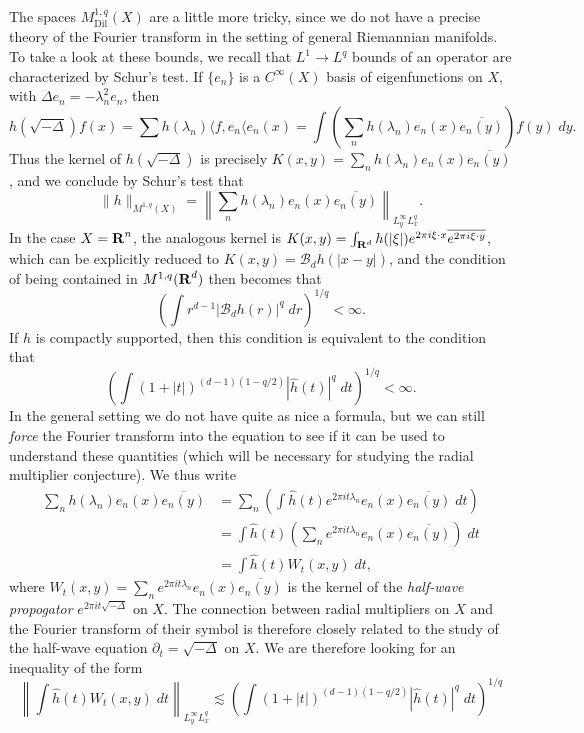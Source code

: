 The spaces $M^{1,q}_{\text{Dil}}(X)$ are a little more tricky, since we do not have a precise theory of the Fourier transform in the setting of general Riemannian manifolds. To take a look at these bounds, we recall that $L^1 \to L^q$ bounds of an operator are characterized by Schur's test. If $\{ e_n \}$ is a $C^\infty(X)$ basis of eigenfunctions on $X$, with $\Delta e_n = - \lambda_n^2 e_n$, then
%
\[ h(\sqrt{-\Delta}) f(x) = \sum h(\lambda_n) \langle f, e_n \langle e_n(x) = \int \left( \sum_n h(\lambda_n) e_n(x) \overline{e_n(y)} \right) f(y)\; dy. \]
%
Thus the kernel of $h(\sqrt{-\Delta})$ is precisely $K(x,y) = \sum_n h(\lambda_n) e_n(x) \overline{e_n(y)}$, and we conclude by Schur's test that
%
\[ \| h \|_{M^{1,q}(X)} = \left\| \sum_n h(\lambda_n) e_n(x) \overline{e_n(y)} \right\|_{L^\infty_y L^q_x}. \]
%
In the case $X = \operatorname{\mathbf{R}}^n$, the analogous kernel is $K(x,y) = \int_{\operatorname{\mathbf{R}}^d} h(|\xi|) e^{2 \pi i \xi \cdot x} \overline{e^{2 \pi i \xi \cdot y}}$, which can be explicitly reduced to $K(x,y) = \mathcal{B}_d h(|x - y|)$, and the condition of being contained in $M^{1,q}(\operatorname{\mathbf{R}}^d)$ then becomes that
%
\[ \left( \int r^{d-1} |\mathcal{B}_d h(r)|^q\; dr \right)^{1/q} < \infty. \]
%
If $h$ is compactly supported, then this condition is equivalent to the condition that
%
\[ \left( \int (1 + |t|)^{(d-1)(1 - q/2)} |\widehat{h}(t)|^q\; dt \right)^{1/q} < \infty. \]
%
In the general setting we do not have quite as nice a formula, but we can still \emph{force} the Fourier transform into the equation to see if it can be used to understand these quantities (which will be necessary for studying the radial multiplier conjecture). We thus write
%
\begin{align*}
    \sum_n h(\lambda_n) e_n(x) \overline{e_n(y)} &= \sum_n \left( \int \widehat{h}(t) e^{2 \pi i t \lambda_n} e_n(x) \overline{e_n(y)}\; dt \right) \\
    &= \int \widehat{h}(t) \left( \sum_n e^{2 \pi i t \lambda_n} e_n(x) \overline{e_n(y)} \right)\; dt\\
    &= \int \widehat{h}(t) W_t(x,y)\; dt,
\end{align*}
%
where $W_t(x,y) = \sum_n e^{2 \pi i t \lambda_n} e_n(x) \overline{e_n(y)}$ is the kernel of the \emph{half-wave propogator} $e^{2 \pi i t \sqrt{-\Delta}}$ on $X$. The connection between radial multipliers on $X$ and the Fourier transform of their symbol is therefore closely related to the study of the half-wave equation $\partial_t = \sqrt{-\Delta}$ on $X$. We are therefore looking for an inequality of the form
%
\[ \left\| \int \widehat{h}(t) W_t(x,y)\; dt \right\|_{L^\infty_y L^q_x} \lesssim \left( \int (1 + |t|)^{(d-1)(1 - q/2)} |\widehat{h}(t)|^q\; dt \right)^{1/q} \]
